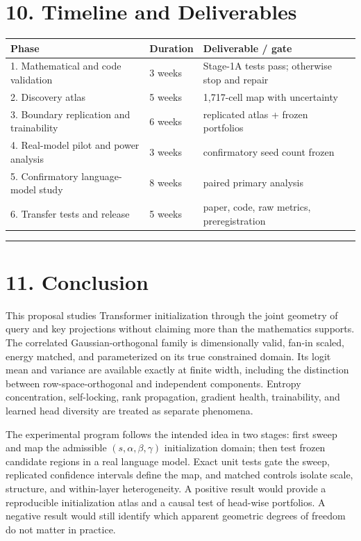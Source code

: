 \documentclass[11pt,letterpaper]{article}
\theoremstyle{definition}
\begin{document}
\section{10. Timeline and Deliverables}
\begin{tabular}{@{}p{}p{}p{}@{}}
\toprule
Phase & Duration & Deliverable / gate \\
\midrule
1. Mathematical and code validation & 3 weeks & Stage-1A tests pass; otherwise stop and repair \\
2. Discovery atlas & 5 weeks & 1,717-cell map with uncertainty \\
3. Boundary replication and trainability & 6 weeks & replicated atlas + frozen portfolios \\
4. Real-model pilot and power analysis & 3 weeks & confirmatory seed count frozen \\
5. Confirmatory language-model study & 8 weeks & paired primary analysis \\
6. Transfer tests and release & 5 weeks & paper, code, raw metrics, preregistration \\
\bottomrule
\end{tabular}

\vspace{0.35em}\hrule\vspace{0.35em}
\section{11. Conclusion}
This proposal studies Transformer initialization through the joint geometry of query and key projections without claiming more than the mathematics supports. The correlated Gaussian-orthogonal family is dimensionally valid, fan-in scaled, energy matched, and parameterized on its true constrained domain. Its logit mean and variance are available exactly at finite width, including the distinction between row-space-orthogonal and independent components. Entropy concentration, self-locking, rank propagation, gradient health, trainability, and learned head diversity are treated as separate phenomena.

The experimental program follows the intended idea in two stages: first sweep and map the admissible $(s,\alpha,\beta,\gamma)$ initialization domain; then test frozen candidate regions in a real language model. Exact unit tests gate the sweep, replicated confidence intervals define the map, and matched controls isolate scale, structure, and within-layer heterogeneity. A positive result would provide a reproducible initialization atlas and a causal test of head-wise portfolios. A negative result would still identify which apparent geometric degrees of freedom do not matter in practice.
\end{document}
